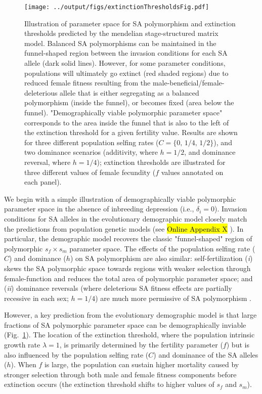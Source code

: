 \documentclass[11pt]{article}
\begin{document}
 \begin{figure}[htbp]
 \centering
 \texttt{[image: ../output/figs/extinctionThresholdsFig.pdf]}
 \caption{\footnotesize{Illustration of parameter space for SA polymorphism and extinction thresholds predicted by the mendelian stage-structured matrix model. Balanced SA polymorphisms can be maintained in the funnel-shaped region between the invasion conditions for each SA allele (dark solid lines). However, for some parameter conditions, populations will ultimately go extinct (red shaded regions) due to reduced female fitness resulting from the male-beneficial/female-deleterious allele that is either segregating as a balanced polymorphism (inside the funnel), or becomes fixed (area below the funnel). "Demographically viable polymorphic parameter space" corresponds to the area inside the funnel that is also to the left of the extinction threshold for a given fertility value. Results are shown for three different population selfing rates ($C = \{0,\,1/4,\,1/2\}$), and two dominance scenarios (additivity, where $h = 1/2$, and dominance reversal, where $h = 1/4$); extinction thresholds are illustrated for three different values of female fecundity ($f$ values annotated on each panel).}}
 \label{fig:extThresholds}
 \end{figure}

We begin with a simple illustration of demographically viable polymorphic parameter space in the absence of inbreeding depression (i.e., $\delta_i = 0$). Invasion conditions for SA alleles in the evolutionary demographic model closely match the predictions from population genetic models (see \hl{Online Appendix X} \citealt{Kidwell1977, JordanConnallon2014, Olito2017}). In particular, the demographic model recovers the classic "funnel-shaped" region of polymorphic $s_f \times s_m$ parameter space. The effects of the population selfing rate ($C$) and dominance ($h$) on SA polymorphism are also similar: self-fertilization ({\itshape i}) skews the SA polymorphic space towards regions with weaker selection through female-function and reduces the total area of polymorphic parameter space; and ({\itshape ii}) dominance reversals (where deleterious SA fitness effects are partially recessive in each sex; $h = 1/4$) are much more permissive of SA polymorphism \citep{JordanConnallon2014, Olito2017}. 

However, a key prediction from the evolutionary demographic model is that large fractions of SA polymorphic parameter space can be demographically inviable (Fig.~\ref{fig:extThresholds}). The location of the extinction threshold, where the population intrinsic growth rate $\lambda = 1$, is primarily determined by the fertility parameter ($f$) but is also influenced by the population selfing rate ($C$) and dominance of the SA alleles ($h$). When $f$ is large, the population can sustain higher mortality caused by stronger selection through both male and female fitness components before extinction occurs (the extinction threshold shifts to higher values of $s_f$ and $s_m$). 
\end{document}

